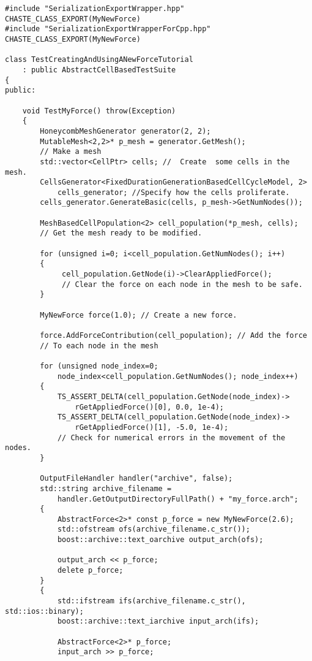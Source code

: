 \begin{lstlisting}
#include "SerializationExportWrapper.hpp"
CHASTE_CLASS_EXPORT(MyNewForce)
#include "SerializationExportWrapperForCpp.hpp"
CHASTE_CLASS_EXPORT(MyNewForce)

class TestCreatingAndUsingANewForceTutorial 
	: public AbstractCellBasedTestSuite
{
public:
	
    void TestMyForce() throw(Exception)
    {
        HoneycombMeshGenerator generator(2, 2);
        MutableMesh<2,2>* p_mesh = generator.GetMesh();
		// Make a mesh
        std::vector<CellPtr> cells; //  Create  some cells in the mesh.
        CellsGenerator<FixedDurationGenerationBasedCellCycleModel, 2> 
			cells_generator; //Specify how the cells proliferate.
        cells_generator.GenerateBasic(cells, p_mesh->GetNumNodes());

        MeshBasedCellPopulation<2> cell_population(*p_mesh, cells);
        // Get the mesh ready to be modified.

        for (unsigned i=0; i<cell_population.GetNumNodes(); i++)
        {
             cell_population.GetNode(i)->ClearAppliedForce();
             // Clear the force on each node in the mesh to be safe.
        }

        MyNewForce force(1.0); // Create a new force.

        force.AddForceContribution(cell_population); // Add the force
		// To each node in the mesh

        for (unsigned node_index=0; 
			node_index<cell_population.GetNumNodes(); node_index++)
        {
            TS_ASSERT_DELTA(cell_population.GetNode(node_index)->
				rGetAppliedForce()[0], 0.0, 1e-4);
            TS_ASSERT_DELTA(cell_population.GetNode(node_index)->
				rGetAppliedForce()[1], -5.0, 1e-4);
			// Check for numerical errors in the movement of the nodes.
        }

        OutputFileHandler handler("archive", false);
        std::string archive_filename = 
			handler.GetOutputDirectoryFullPath() + "my_force.arch";
        {
            AbstractForce<2>* const p_force = new MyNewForce(2.6);
            std::ofstream ofs(archive_filename.c_str());
            boost::archive::text_oarchive output_arch(ofs);

            output_arch << p_force;
            delete p_force;
        }
        {
            std::ifstream ifs(archive_filename.c_str(), std::ios::binary);
            boost::archive::text_iarchive input_arch(ifs);

            AbstractForce<2>* p_force;
            input_arch >> p_force;


\end{lstlisting}
